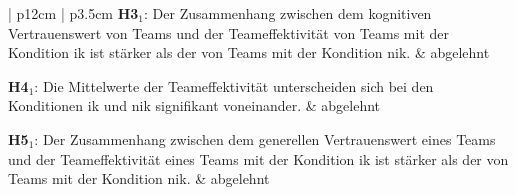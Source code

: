 \documentclass[a4paper,11pt]{article}%
\renewcommand{\\}{\vspace*{0.5\baselineskip} \newline}
\begin{document}
{{\begin{table}[H]
\begin{tabularx}{\textwidth}{| p{12cm} | p{3.5cm}}
		\hline 	\\	
%
\textbf{H3$_{1}$}: Der Zusammenhang zwischen dem kognitiven Vertrauenswert von Teams und der Teameffektivität von Teams mit der Kondition \ac{ik} ist stärker als der von Teams mit der Kondition \ac{nik}. \\
		& abgelehnt \\		
		
		\hline 	\\	
		\textbf{H4$_{1}$}: Die Mittelwerte der Teameffektivität unterscheiden sich bei den Konditionen \ac{ik} und \ac{nik} signifikant voneinander.\\
		& abgelehnt\\

		\hline 	\\	
			\textbf{H5$_{1}$}: Der Zusammenhang zwischen dem generellen Vertrauenswert eines Teams und der Teameffektivität eines Teams mit der Kondition \ac{ik} ist stärker als der von Teams mit der Kondition \ac{nik}. \\
		& abgelehnt \\
		

\end{tabularx}
\end{table}}}
\end{document}
